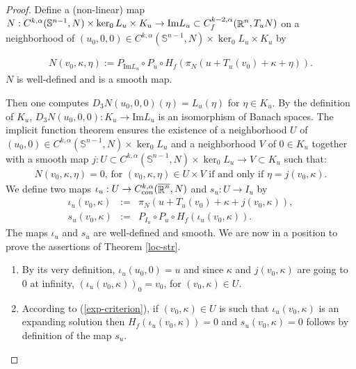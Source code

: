 \documentclass[a4paper,11pt,reqno]{amsart}
\def\R{\mathop{\rm \mathbb{R}}\nolimits}
\newcommand{\Ima}{\text{Im}}
\begin{document}
\begin{proof}

Define a (non-linear) map $N:C^{k,\alpha}(\mathbb{S}^{n-1},N)\times\ker_0L_u\times K_u\rightarrow \Ima L_u\subset C_f^{k-2,\alpha}(\R^n,T_uN)$ on a neighborhood of $(u_0,0,0)\in C^{k,\alpha}(\mathbb{S}^{n-1},N)\times\ker_0L_u\times K_u$ by

\begin{eqnarray*}
N(v_0,\kappa,\eta):=P_{\Ima L_u}\circ P_u\circ H_f(\pi_N(u+T_u(v_0)+\kappa+\eta)).
\end{eqnarray*}
$N$ is well-defined and is a smooth map.

Then one computes $D_3N(u_0,0,0)(\eta)=L_u(\eta)$ for $\eta\in K_u$. By the definition of $K_u$, $D_3N(u_0,0,0):K_u\rightarrow \Ima L_u$ is an isomorphism of Banach spaces. The implicit function theorem ensures the existence of a neighborhood $U$ of $(u_0,0)\in C^{k,\alpha}(\mathbb{S}^{n-1},N)\times\ker_0L_u$ and a neighborhood $V$ of $0\in K_u$ together with a smooth map $j: U\subset C^{k,\alpha}(\mathbb{S}^{n-1},N)\times\ker_0L_u\rightarrow V\subset K_u$ such that:
\begin{eqnarray}
\text{$N(v_0,\kappa,\eta)=0$, for $(v_0,\kappa,\eta)\in U\times V$ if and only if $\eta=j(v_0,\kappa)$.}\label{exp-criterion}
\end{eqnarray}
We define two maps $\iota_u:U\rightarrow C^{k,\alpha}_{con}(\overline{\R^n},N)$ and $s_u: U\rightarrow I_u$ by
\begin{eqnarray*}
\iota_u(v_0,\kappa)&:=&\pi_N(u+T_u(v_0)+\kappa+j(v_0,\kappa)),\\
s_u(v_0,\kappa)&:=&P_{I_u}\circ P_u\circ H_f(\iota_u(v_0,\kappa)).
\end{eqnarray*}
The maps $\iota_u$ and $s_u$ are well-defined and smooth. We are now in a position to prove the assertions of Theorem \ref{loc-str}.

\begin{enumerate}
\item By its very definition, $\iota_u(u_0,0)=u$ and since $\kappa$ and $j(v_0,\kappa)$ are going to $0$ at infinity, $(\iota_u(v_0,\kappa))_0=v_0$, for $(v_0,\kappa)\in U$.\\

\item According to (\ref{exp-criterion}), if $(v_0,\kappa)\in U$ is such that $\iota_u(v_0,\kappa)$ is an expanding solution then $H_f(\iota_u(v_0,\kappa))=0$ and $s_u(v_0,\kappa)=0$ follows by definition of the map $s_u$. \\


\end{enumerate}
\end{proof}
\end{document}
